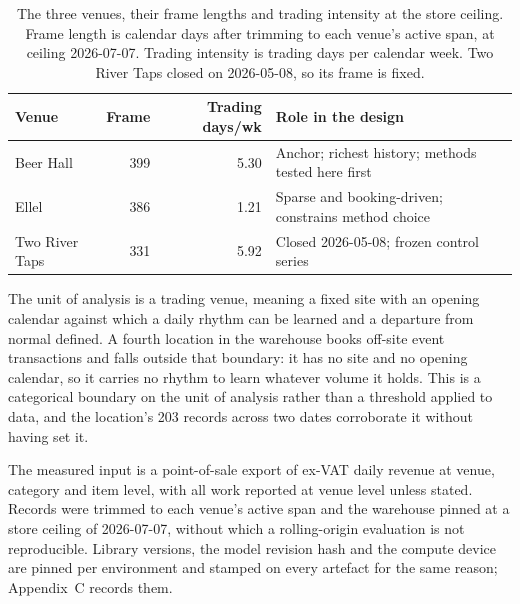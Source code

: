 \begin{table}[t]
\centering
\small
\caption[The three venues, their frame lengths and trading intensity at the store ceiling]{The
three venues, their frame lengths and trading intensity at the store ceiling. Frame length is
calendar days after trimming to each venue's active span, at ceiling 2026-07-07. Trading
intensity is trading days per calendar week. Two River Taps closed on 2026-05-08, so its frame
is fixed.}
\label{tab:venues}
\begin{tabular}{lrrp{}}
\toprule
Venue & Frame & Trading days/wk & Role in the design \\
\midrule
Beer Hall      & 399 & 5.30 & Anchor; richest history; methods tested here first \\
Ellel          & 386 & 1.21 & Sparse and booking-driven; constrains method choice \\
Two River Taps & 331 & 5.92 & Closed 2026-05-08; frozen control series \\
\bottomrule
\end{tabular}
\end{table}

The unit of analysis is a trading venue, meaning a fixed site with an opening calendar against
which a daily rhythm can be learned and a departure from normal defined. A fourth location in
the warehouse books off-site event transactions and falls outside that boundary: it has no site
and no opening calendar, so it carries no rhythm to learn whatever volume it holds. This is a
categorical boundary on the unit of analysis rather than a threshold applied to data, and the
location's 203 records across two dates corroborate it without having set it.

The measured input is a point-of-sale export of ex-VAT daily revenue at venue, category and item
level, with all work reported at venue level unless stated. Records were trimmed to each venue's
active span and the warehouse pinned at a store ceiling of 2026-07-07, without which a
rolling-origin evaluation is not reproducible.
\label{sec:repro}
Library versions, the model revision hash and the compute device are pinned per environment and
stamped on every artefact for the same reason; Appendix~C records them.

